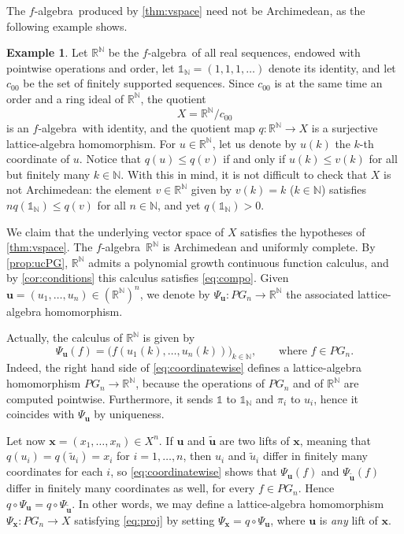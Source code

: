 \documentclass{amsart}
\theoremstyle{plain}
\theoremstyle{definition}
\newtheorem{example}[thm]{Example}
\theoremstyle{remark}
\newcommand\N{\ensuremath{\mathbb{N}}}
\newcommand\R{\ensuremath{\mathbb{R}}}
\newcommand{\one}{\mathbb{1}}
\newcommand{\falg}{$f\!$-algebra}
\newcommand{\Psx}{\Psi_{\bm x}}
\begin{document}
The \falg\ produced by \cref{thm:vspace} need not be Archimedean, as
the following example shows.

\begin{example}
    Let $\R^{\N}$ be the \falg\ of all real sequences, endowed with
    pointwise operations and order, let $\one_{\N}=(1,1,1,\ldots )$
    denote its identity, and let $c_{00}$ be the set of finitely
    supported sequences. Since $c_{00}$ is at the same time an order
    and a ring ideal of $\R^{\N}$, the quotient
    \[
        X=\R^{\N}/c_{00}
    \]
    is an \falg\ with identity, and the
    quotient map $q\colon \R^{\N}\to X$ is a surjective lattice-algebra
    homomorphism. For $u \in \R^{\N}$, let us denote by $u(k)$ the
    $k$-th coordinate of $u$. Notice that $q(u)\le q(v)$ if and only
    if $u(k)\le v(k)$ for all but finitely many $k \in \N$.
    With this in mind, it is not difficult to check that $X$ is not
    Archimedean: the element $v \in \R^{\N}$ given by $v(k)=k$ ($k \in
    \N$) satisfies $n q(\one_\N)\le q(v)$ for all $n \in \N$, and yet
    $q(\one_\N)>0$.

    We claim that the underlying vector space of $X$ satisfies the
    hypotheses of \cref{thm:vspace}. The \falg\ $\R^{\N}$ is
    Archimedean and uniformly complete. By
    \cref{prop:ucPG}, $\R^{\N}$ admits a polynomial growth continuous
    function calculus, and by \cref{cor:conditions} this calculus
    satisfies \eqref{eq:compo}. Given $\bm u=(u_{1},\ldots ,u_{n})\in
    (\R^{\N})^{n}$, we denote by $\Psi _{\bm u}\colon PG_n\to \R^{\N}$
    the associated lattice-algebra homomorphism.

    Actually, the calculus of $\R^{\N}$ is given by
    \begin{equation}\label{eq:coordinatewise}
        \Psi _{\bm u}(f)=\big( f(u_{1}(k),\ldots ,u_{n}(k)) \big)_{k \in
        \N},\qquad \text{where }f \in PG_n.
    \end{equation}
    Indeed, the right hand side of \eqref{eq:coordinatewise} defines a
    lattice-algebra homomorphism $PG_n\to \R^{\N}$, because the
    operations of $PG_n$ and of $\R^{\N}$ are computed pointwise.
    Furthermore, it
    sends $\one$ to $\one_{\N}$ and $\pi _i$ to $u_{i}$, hence it
    coincides with $\Psi _{\bm u}$ by uniqueness.

    Let now $\bm x=(x_1,\ldots ,x_n)\in X^{n}$. If $\bm u$ and $\tilde{\bm u}$ are two lifts of
    $\bm x$, meaning that $q(u_i)=q(\tilde u_i)=x_i$ for $i=1,\ldots
    ,n$, then $u_{i}$ and $\tilde u_{i}$ differ in finitely many
    coordinates for each $i$, so \eqref{eq:coordinatewise} shows that
    $\Psi _{\bm u}(f)$ and $\Psi _{\tilde{\bm u}}(f)$ differ in
    finitely many coordinates as well, for every $f \in PG_n$. Hence
    $q\circ \Psi _{\bm u}=q\circ \Psi _{\tilde{\bm u}}$. In other
    words, we may define a lattice-algebra homomorphism $\Psx\colon
    PG_n\to X$ satisfying \eqref{eq:proj} by setting $\Psx=q\circ\Psi
    _{\bm u}$, where $\bm u$ is \emph{any} lift of $\bm x$.


\end{example}
\end{document}
